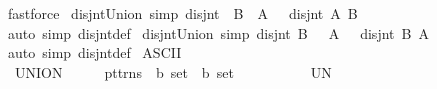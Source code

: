 \begin{isabellebody}
\ fastforce%
\endisatagproof
{\isafoldproof}%
%
\isadelimproof
\isanewline
%
\endisadelimproof
\isanewline
{}\isamarkupfalse%
\ disjnt{\isacharunderscore}{\kern0pt}Union{}\ {\isacharbrackleft}{\kern0pt}simp{\isacharbrackright}{\kern0pt}{\isacharcolon}{\kern0pt}\ {\isachardoublequoteopen}disjnt\ {\isacharparenleft}{\kern0pt}{\isasymUnion}{\isasymA}{\isacharparenright}{\kern0pt}\ B\ {\isasymlongleftrightarrow}\ {\isacharparenleft}{\kern0pt}{\isasymforall}A\ {\isasymin}\ {\isasymA}{\isachardot}{\kern0pt}\ disjnt\ A\ B{\isacharparenright}{\kern0pt}{\isachardoublequoteclose}\isanewline
%
\isadelimproof
\ \ %
\endisadelimproof
%
\isatagproof
{}\isamarkupfalse%
\ {\isacharparenleft}{\kern0pt}auto\ simp{\isacharcolon}{\kern0pt}\ disjnt{\isacharunderscore}{\kern0pt}def{\isacharparenright}{\kern0pt}%
\endisatagproof
{\isafoldproof}%
%
\isadelimproof
\isanewline
%
\endisadelimproof
\isanewline
{}\isamarkupfalse%
\ disjnt{\isacharunderscore}{\kern0pt}Union{}\ {\isacharbrackleft}{\kern0pt}simp{\isacharbrackright}{\kern0pt}{\isacharcolon}{\kern0pt}\ {\isachardoublequoteopen}disjnt\ B\ {\isacharparenleft}{\kern0pt}{\isasymUnion}{\isasymA}{\isacharparenright}{\kern0pt}\ {\isasymlongleftrightarrow}\ {\isacharparenleft}{\kern0pt}{\isasymforall}A\ {\isasymin}\ {\isasymA}{\isachardot}{\kern0pt}\ disjnt\ B\ A{\isacharparenright}{\kern0pt}{\isachardoublequoteclose}\isanewline
%
\isadelimproof
\ \ %
\endisadelimproof
%
\isatagproof
{}\isamarkupfalse%
\ {\isacharparenleft}{\kern0pt}auto\ simp{\isacharcolon}{\kern0pt}\ disjnt{\isacharunderscore}{\kern0pt}def{\isacharparenright}{\kern0pt}%
\endisatagproof
{\isafoldproof}%
%
\isadelimproof
%
\endisadelimproof
%
\isadelimdocument
%
\endisadelimdocument
%
\isatagdocument
%
\isamarkuptrue%
%
\endisatagdocument
{\isafolddocument}%
%
\isadelimdocument
%
\endisadelimdocument
{}\isamarkupfalse%
\ {\isacharparenleft}{\kern0pt}ASCII{\isacharparenright}{\kern0pt}\isanewline
\ \ {\isachardoublequoteopen}{\isacharunderscore}{\kern0pt}UNION{}{\isachardoublequoteclose}\ \ \ \ \ {\isacharcolon}{\kern0pt}{\isacharcolon}{\kern0pt}\ {\isachardoublequoteopen}pttrns\ {\isacharequal}{\kern0pt}{\isachargreater}{\kern0pt}\ {\isacharprime}{\kern0pt}b\ set\ {\isacharequal}{\kern0pt}{\isachargreater}{\kern0pt}\ {\isacharprime}{\kern0pt}b\ set{\isachardoublequoteclose}\ \ \ \ \ \ \ \ \ \ \ {\isacharparenleft}{\kern0pt}{\isachardoublequoteopen}{\isacharparenleft}{\kern0pt}{}UN\ {\isacharunderscore}{\kern0pt}{\isachardot}{\kern0pt}{\isacharslash}{\kern0pt}\ {\isacharunderscore}{\kern0pt}{\isacharparenright}{\kern0pt}{\isachardoublequoteclose}\ {\isacharbrackleft}{\kern0pt}{}{\isacharcomma}{\kern0pt}\ {}{}{\isacharbrackright}{\kern0pt}\ {}{}{\isacharparenright}{\kern0pt}\isanewline

\end{isabellebody}
